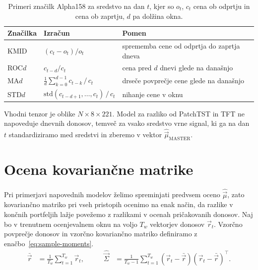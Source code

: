 \documentclass[9pt]{style/friteza}
\begin{document}
\begin{table}[H]
\centering
\caption{Primeri značilk Alpha158 za sredstvo na dan $t$, kjer so $o_t$, $c_t$ cena ob odprtju in cena ob zaprtju, $d$ pa dolžina okna.}
\label{tab:alpha158}
\sffamily\fontsize{7.5}{10}\selectfont %
\begin{tabular*}{\linewidth}{@{\extracolsep{\fill}}lll}
\hline
 \rule[-3pt]{0pt}{12.5pt}\textbf{Značilka} & \textbf{Izračun} & \textbf{Pomen} \\
\hline
KMID & $(c_t-o_t)/o_t$ & sprememba cene od odprtja do zaprtja dneva \\
ROC$d$ & $c_{t-d}/c_t$ & cena pred $d$ dnevi glede na današnjo \\
MA$d$ & $\frac{1}{d}\sum_{k=0}^{d-1}c_{t-k}\,/\,c_t$ & drseče povprečje cene glede na današnjo \\
STD$d$ & $\mathrm{std}(c_{t-d+1},\dots,c_t)\,/\,c_t$ & nihanje cene v oknu \\
\hline
\end{tabular*}
\end{table}

Vhodni tenzor je oblike $N\times 8\times 221$. Model za razliko od PatchTST in TFT ne napoveduje dnevnih donosov, temveč za vsako sredstvo vrne signal, ki ga na dan $t$ standardiziramo med sredstvi in zberemo v vektor $\hat{\vec{\mu}}_{\mathrm{MASTER}}$. 


\section{Ocena kovariančne matrike}\label{sec:cov}

Pri primerjavi napovednih modelov želimo spreminjati predvsem oceno $\hat{\vec{\mu}}$, zato kovariančno matriko pri vseh pristopih ocenimo na enak način, da razlike v končnih portfeljih lažje povežemo z razlikami v ocenah pričakovanih donosov. Naj bo v trenutnem ocenjevalnem oknu na voljo $T_w$ vektorjev donosov $\vec{r}_t$. Vzorčno povprečje donosov in vzorčno kovariančno matriko definiramo z enačbo~\eqref{eq:sample-moments}.
\begin{equation}
\label{eq:sample-moments}
\begin{aligned}
\bar{\vec{r}}
&=
\frac{1}{T_w}
\sum_{t=1}^{T_w}\vec{r}_t,
\qquad
&
\hat{\vec{\Sigma}}
&=
\frac{1}{T_w-1}
\sum_{t=1}^{T_w}
(\vec{r}_t-\bar{\vec{r}})
(\vec{r}_t-\bar{\vec{r}})^{\top}.
\end{aligned}
\end{equation}
\end{document}
